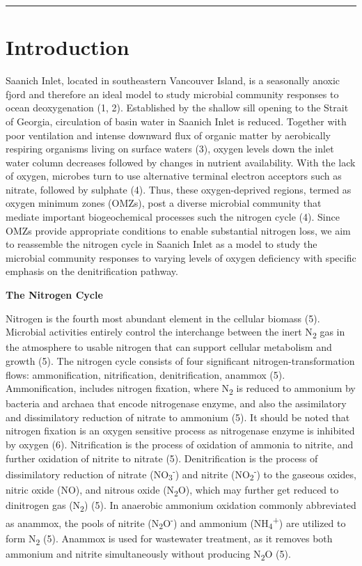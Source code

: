 \documentclass[11 pt,]{article}
\begin{document}
\begin{center}\rule{0.5\linewidth}{\linethickness}\end{center}

\section{Introduction}\label{introduction}

Saanich Inlet, located in southeastern Vancouver Island, is a seasonally
anoxic fjord and therefore an ideal model to study microbial community
responses to ocean deoxygenation (1, 2). Established by the shallow sill
opening to the Strait of Georgia, circulation of basin water in Saanich
Inlet is reduced. Together with poor ventilation and intense downward
flux of organic matter by aerobically respiring organisms living on
surface waters (3), oxygen levels down the inlet water column decreases
followed by changes in nutrient availability. With the lack of oxygen,
microbes turn to use alternative terminal electron acceptors such as
nitrate, followed by sulphate (4). Thus, these oxygen-deprived regions,
termed as oxygen minimum zones (OMZs), post a diverse microbial
community that mediate important biogeochemical processes such the
nitrogen cycle (4). Since OMZs provide appropriate conditions to enable
substantial nitrogen loss, we aim to reassemble the nitrogen cycle in
Saanich Inlet as a model to study the microbial community responses to
varying levels of oxygen deficiency with specific emphasis on the
denitrification pathway.

\textbf{The Nitrogen Cycle}

Nitrogen is the fourth most abundant element in the cellular biomass
(5). Microbial activities entirely control the interchange between the
inert N\textsubscript{2} gas in the atmosphere to usable nitrogen that
can support cellular metabolism and growth (5). The nitrogen cycle
consists of four significant nitrogen-transformation flows:
ammonification, nitrification, denitrification, anammox (5).
Ammonification, includes nitrogen fixation, where N\textsubscript{2} is
reduced to ammonium by bacteria and archaea that encode nitrogenase
enzyme, and also the assimilatory and dissimilatory reduction of nitrate
to ammonium (5). It should be noted that nitrogen fixation is an oxygen
sensitive process as nitrogenase enzyme is inhibited by oxygen (6).
Nitrification is the process of oxidation of ammonia to nitrite, and
further oxidation of nitrite to nitrate (5). Denitrification is the
process of dissimilatory reduction of nitrate
(NO\textsubscript{3}\textsuperscript{-}) and nitrite
(NO\textsubscript{2}\textsuperscript{-}) to the gaseous oxides, nitric
oxide (NO), and nitrous oxide (N\textsubscript{2}O), which may further
get reduced to dinitrogen gas (N\textsubscript{2}) (5). In anaerobic
ammonium oxidation commonly abbreviated as anammox, the pools of nitrite
(N\textsubscript{2}O\textsuperscript{-}) and ammonium
(NH\textsubscript{4}\textsuperscript{+}) are utilized to form
N\textsubscript{2} (5). Anammox is used for wastewater treatment, as it
removes both ammonium and nitrite simultaneously without producing
N\textsubscript{2}O (5).
\end{document}
